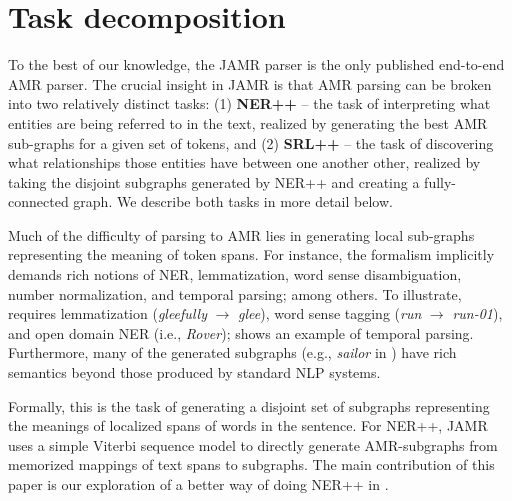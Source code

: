 \documentclass[11pt]{article}
\begin{document}
\section{Task decomposition}



To the best of our knowledge, the JAMR parser \cite{2014flanigan-amr} is
the only published end-to-end AMR parser.
The crucial insight in JAMR is that AMR parsing can be broken into two 
relatively distinct tasks: (1) \textbf{NER++} -- the task of interpreting what entities are being referred to in 
the text, realized by generating the best AMR sub-graphs for a given set of tokens, and
(2) \textbf{SRL++} -- the task of discovering what 
relationships those entities have between one another other, realized by taking the disjoint subgraphs generated
  by NER++ and creating a fully-connected graph.
We describe both tasks in more detail below.


Much of the difficulty of parsing to AMR lies in generating local sub-graphs representing the meaning of token spans.
For instance, the formalism implicitly demands rich notions of NER, lemmatization, word sense disambiguation, number normalization, and temporal parsing; among others.
To illustrate,  requires lemmatization (\textit{gleefully} $\rightarrow$ \textit{glee}), word sense tagging (\textit{run} $\rightarrow$ \textit{run-01}), and open domain NER (i.e., \textit{Rover});  shows an example of temporal parsing.
Furthermore, many of the generated subgraphs (e.g., \textit{sailor} in ) have rich semantics beyond those produced by standard NLP systems.

Formally, this is the task of generating a disjoint set of subgraphs representing the meanings of localized spans of words in the sentence.
For NER++, JAMR uses a simple Viterbi sequence model to directly generate AMR-subgraphs from memorized mappings of text spans to subgraphs. The main contribution of this paper is our exploration of a better way of doing NER++ in .
\end{document}
